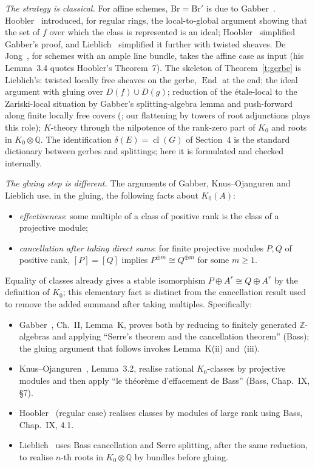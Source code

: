 \documentclass[11pt]{amsart}
\theoremstyle{definition}
\theoremstyle{remark}
\newcommand{\End}{\operatorname{End}}
\newcommand{\cl}{\operatorname{cl}}
\begin{document}
\emph{The strategy is classical.} For affine schemes, $\mathrm{Br}=\mathrm{Br}'$ is
due to Gabber~\cite{Gabber}. Hoobler~\cite{Hoobler80} introduced, for regular
rings, the local-to-global argument showing that the set of $f$ over which the
class is represented is an ideal; Hoobler~\cite{Hoobler} simplified Gabber's
proof, and Lieblich~\cite[\S3.1.4]{Lieblich} simplified it further with twisted
sheaves. De Jong~\cite{deJong}, for schemes with an ample line bundle, takes the
affine case as input (his Lemma~3.4 quotes Hoobler's Theorem~7). The skeleton of
Theorem~\ref{t:gerbe} is Lieblich's: twisted locally free sheaves on the gerbe,
$\End$ at the end; the ideal argument with gluing over $D(f)\cup D(g)$;
reduction of the \'etale-local to the Zariski-local situation by Gabber's
splitting-algebra lemma and push-forward along finite locally free covers
(\cite[3.1.3.5--6]{Lieblich}; our flattening by towers of root adjunctions
plays this role); $K$-theory through the nilpotence of the rank-zero part of
$K_0$ and roots in $K_0\otimes\mathbb Q$. The identification
$\delta(E)=\cl(G)$ of Section~4 is the standard dictionary between gerbes and
splittings; here it is formulated and checked internally.

\emph{The gluing step is different.} The arguments of Gabber,
Knus--Ojanguren and Lieblich use, in the gluing, the following facts about
$K_0(A)$:
\begin{itemize}
\item \emph{effectiveness}: some multiple of a class of positive rank is the
  class of a projective module;
\item \emph{cancellation after taking direct sums}: for finite projective
  modules $P,Q$ of positive rank, $[P]=[Q]$ implies
  $P^{\oplus m}\cong Q^{\oplus m}$ for some $m\geq1$.
\end{itemize}
Equality of classes already gives a stable isomorphism
$P\oplus A^r\cong Q\oplus A^r$ by the definition of $K_0$; this elementary
fact is distinct from the cancellation result used to remove the added
summand after taking multiples.
Specifically:
\begin{itemize}
\item Gabber~\cite{Gabber}, Ch.~II, Lemma~K, proves both by reducing to
  finitely generated $\mathbb Z$-algebras and applying ``Serre's theorem and the
  cancellation theorem'' (Bass); the gluing argument that follows invokes
  Lemma~K(ii) and~(iii).
\item Knus--Ojanguren~\cite{KO}, Lemma~3.2, realise rational $K_0$-classes by
  projective modules and then apply ``le th\'eor\`eme d'effacement de Bass''
  (Bass, Chap.~IX, \S7).
\item Hoobler~\cite{Hoobler80} (regular case) realises classes by modules of
  large rank using Bass, Chap.~IX, 4.1.
\item Lieblich~\cite[3.1.4.3, 3.1.4.4]{Lieblich} uses Bass cancellation and
  Serre splitting, after the same reduction, to realise $n$-th roots in
  $K_0\otimes\mathbb Q$ by bundles before gluing.
\end{itemize}
\end{document}
